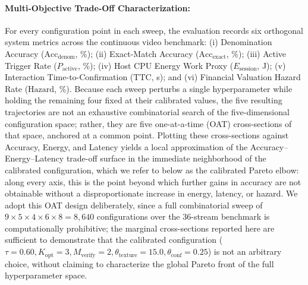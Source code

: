 \documentclass[final,5p,times,twocolumn,authoryear]{elsarticle}
\begin{document}
\paragraph{Multi-Objective Trade-Off Characterization:}
For every configuration point in each sweep, the evaluation records six orthogonal system metrics across the continuous video benchmark: (i) Denomination Accuracy ($\text{Acc}_{\text{denom}}$, \%); (ii) Exact-Match Accuracy ($\text{Acc}_{\text{exact}}$, \%); (iii) Active Trigger Rate ($P_{\text{active}}$, \%); (iv) Host CPU Energy Work Proxy ($E_{\text{session}}$, J); (v) Interaction Time-to-Confirmation ($\text{TTC}$, s); and (vi) Financial Valuation Hazard Rate ($\text{Hazard}$, \%). Because each sweep perturbs a single hyperparameter while holding the remaining four fixed at their calibrated values, the five resulting trajectories are not an exhaustive combinatorial search of the five-dimensional configuration space; rather, they are five one-at-a-time (OAT) cross-sections of that space, anchored at a common point. Plotting these cross-sections against Accuracy, Energy, and Latency yields a local approximation of the Accuracy--Energy--Latency trade-off surface in the immediate neighborhood of the calibrated configuration, which we refer to below as the calibrated Pareto elbow: along every axis, this is the point beyond which further gains in accuracy are not obtainable without a disproportionate increase in energy, latency, or hazard. We adopt this OAT design deliberately, since a full combinatorial sweep of $9 \times 5 \times 4 \times 6 \times 8 = 8{,}640$ configurations over the 36-stream benchmark is computationally prohibitive; the marginal cross-sections reported here are sufficient to demonstrate that the calibrated configuration ($\tau = 0.60, K_{\text{opt}} = 3, M_{\text{verify}} = 2, \theta_{\text{texture}} = 15.0, \theta_{\text{conf}} = 0.25$) is not an arbitrary choice, without claiming to characterize the global Pareto front of the full hyperparameter space.
\end{document}
